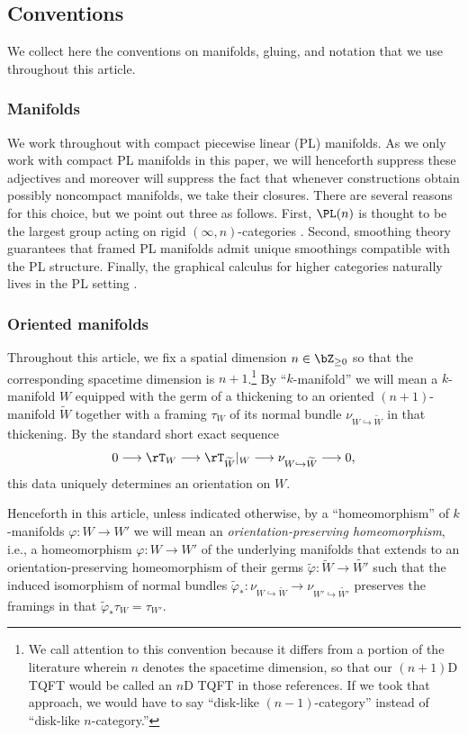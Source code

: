 \documentclass[12pt,reqno]{amsart}
\newcommand{\tld}[1]{{\widetilde{#1}}}
\newcommand{\defn}[1]{\emph{#1}}
\begin{document}
\subsection{Conventions}
\label{sec:conventions}
We collect here the conventions on manifolds, gluing, and notation that we use throughout this article.

\subsubsection{Manifolds}
\label{PL-justification}
We work throughout with compact piecewise linear (PL) manifolds. As we only work with compact PL manifolds in this paper, we will henceforth suppress these adjectives and moreover will suppress the fact that whenever constructions obtain possibly noncompact manifolds, we take their closures. There are several reasons for this choice, but we point out three as follows. First, $\PL(n)$ is thought to be the largest group acting on rigid $(\infty, n)$-categories \cite[Statement 6.2]{FHJF24}. Second, smoothing theory \cite[Essay IV]{KS77} guarantees that framed PL manifolds admit unique smoothings compatible with the PL structure. Finally, the graphical calculus for higher categories naturally lives in the PL setting \cite[§6]{FHJF24}. 

\subsubsection{Oriented manifolds}
Throughout this article, we fix a spatial dimension $n\in\bZ_{\geq 0}$ so that the corresponding spacetime dimension is $n+1$.\footnote{We call attention to this convention because it differs from a portion of the literature wherein $n$ denotes the spacetime dimension, so that our $(n+1)$D TQFT would be called an $n$D TQFT in those references. If we took that approach, we would have to say ``disk-like $(n-1)$-category'' instead of ``disk-like $n$-category.''}
By ``$k$-manifold'' we will mean a $k$-manifold $W$ equipped with the germ of a thickening to an oriented $(n+1)$-manifold $\tld W$ together with a framing $\tau_W$ of its normal bundle $\nu_{W\hookrightarrow\tld{W}}$ in that thickening. By the standard short exact sequence
\[
0 \longrightarrow \rT_{W} \longrightarrow \rT_{\tld W}\vert{}_{W} \longrightarrow \nu_{W\hookrightarrow\tld W} \longrightarrow 0,
\]
this data uniquely determines an orientation on $W$.

Henceforth in this article, unless indicated otherwise, by a ``homeomorphism'' of $k$-manifolds $\varphi\colon W\to W'$ we will mean an \defn{orientation-preserving homeomorphism}, i.e., a homeomorphism $\varphi\colon W\to W'$ of the underlying manifolds that extends to an orientation-preserving homeomorphism of their germs $\tld\varphi\colon\tld W\to\tld {W'}$ such that the induced isomorphism of normal bundles $\tld\varphi_* \colon \nu_{W\hookrightarrow\tld W} \to \nu_{W'\hookrightarrow\tld {W'}}$ preserves the framings in that $\tld\varphi_*\tau_W=\tau_{W'}$.
\end{document}
